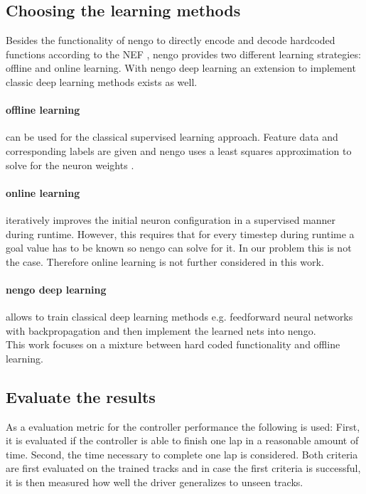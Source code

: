 \documentclass[10pt,a4paper,twoside,journal]{IEEEtran}
\begin{document}
\subsection{Choosing the learning methods}

Besides the functionality of nengo to directly encode and decode hardcoded functions according to the NEF \cite{nef}, nengo provides two different learning strategies: offline and online learning. With nengo deep learning \cite{nengo_dl} an extension to implement classic deep learning methods exists as well.

\paragraph{offline learning} can be used for the classical supervised learning approach. Feature data and corresponding labels are given and nengo uses a least squares approximation to solve for the neuron weights \cite{nef}.

\paragraph{online learning} iteratively improves the initial neuron configuration in a supervised manner during runtime. However, this requires that for every timestep during runtime a goal value has to be known so nengo can solve for it. In our problem this is not the case. Therefore online learning is not further considered in this work.

\paragraph{nengo deep learning} allows to train classical deep learning methods e.g. feedforward neural networks with backpropagation and then implement the learned nets into nengo. \\
This work focuses on a mixture between hard coded functionality and offline learning.

\subsection{Evaluate the results}
As a evaluation metric for the controller performance the following is used: First, it is evaluated if the controller is able to finish one lap in a reasonable amount of time. Second, the time necessary to complete one lap is considered. Both criteria are first evaluated on the trained tracks and in case the first criteria is successful, it is then measured how well the driver generalizes to unseen tracks.
\end{document}
